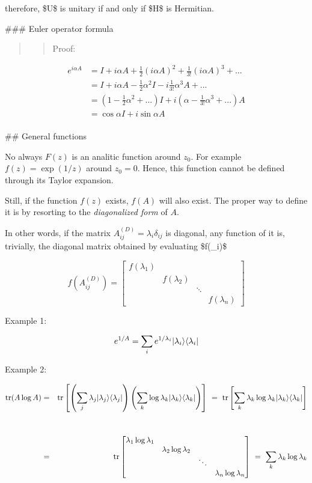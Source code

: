 \documentclass[11pt]{article}
\begin{document}
therefore, \$U\$ is unitary if and only if \$H\$ is Hermitian.

    \#\#\# Euler operator formula

\begin{quote}
\begin{quote}
Proof:
\end{quote}
\end{quote}

\[
\begin{align}
e^{i\alpha A} &   = I + i\alpha A + \frac{1}{2} (i\alpha A)^2 + \frac{1}{3!}(i\alpha A)^3 + ...  \\
    & = I  + i \alpha A - \frac{1}{2} \alpha^2 I - i\frac{1}{3!} \alpha^3 A + ... \\
    & = \left(1  - \frac{1}{2} \alpha^2  + ...\right)I + i  \left(\alpha  -  \frac{1}{3!} \alpha^3  + ... \right)A \\
    & = \cos \alpha I + i \sin\alpha A
\end{align}    
\]\\

    \#\# General functions

    No always \(F(z)\) is an analitic function around \(z_0\). For example
\(f(z) = \exp(1/z)\) around \(z_0=0\). Hence, this function cannot be
defined through its Taylor expansion.

Still, if the function \(f(z)\) exists, \(f(A)\) will also exist. The
proper way to define it is by resorting to the \emph{diagonalized form}
of \(A\).

    

    In other words, if the matrix \(A^{(D)}_{ij} = \lambda_i \delta_{ij}\)
is diagonal, any function of it is, trivially, the diagonal matrix
obtained by evaluating \$f(\lambda\_i)\$

\[
f(A^{(D)}_{ij}) = \begin{bmatrix} f(\lambda_1)& &  & \\ & f(\lambda_2) & &  \\ & & \ddots & \\ & & & f(\lambda_n)\end{bmatrix}
\]

    Example 1:

\[e^{1/A} = \sum_i e^{1/\lambda_i} |\lambda_i\rangle\langle \lambda_i|\]

    Example 2:

\begin{eqnarray}
{\rm tr}(A \log A) &=& {\rm tr}\left[\left(\sum_j \lambda_j \ket{\lambda_j}\bra{\lambda_j}\right)\left(\sum_k\log \lambda_k \ket{\lambda_k}\bra{\lambda_k}\right)\right] ~=~  {\rm tr}\left[\sum_k \lambda_k \log\lambda_k \ket{\lambda_k}\bra{\lambda_k} \right] \\ \rule{0mm}{20mm}
&=& {\rm tr} \begin{bmatrix} \lambda_1 \log \lambda_1& &  & \\ &\lambda_2 \log \lambda_2 & &  \\ & & \ddots & \\ & & & \lambda_n \log \lambda_n
\end{bmatrix}
 ~= ~ \sum_k \lambda_k \log \lambda_k \rule{0mm}{8mm}
\end{eqnarray}
\end{document}
